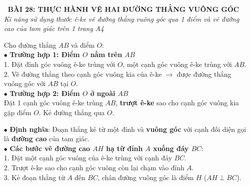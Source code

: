 \documentclass[14pt,a4paper,oneside]{extbook}
\begin{document}
\noindent
\begin{tcolorbox}[
  enhanced,
  colback=teal!8!white,
  colframe=teal!80!black,
  arc=3mm, boxrule=1pt,
  left=3mm, right=3mm, top=2mm, bottom=2mm,
  halign=center
]
  {\Large\bfseries\color{teal!90!black}\faBookmark\ BÀI 28: THỰC HÀNH VẼ HAI ĐƯỜNG THẲNG VUÔNG GÓC}\\[1.5pt]
  {\footnotesize\itshape\color{black!75} Kĩ năng sử dụng thước ê-ke vẽ đường thẳng vuông góc qua 1 điểm và vẽ đường cao của tam giác trên 1 trang A4}
\end{tcolorbox}

\vspace{2mm}

\noindent
\begin{minipage}[t]{0.49\textwidth}
  \begin{tcolorbox}[
    enhanced,
    title={\footnotesize\bfseries\color{white}\faPencil\ 1. Vẽ đường thẳng vuông góc qua 1 điểm},
    colback=blue!2!white,
    colframe=blue!75!black,
    arc=2.5mm, boxrule=0.8pt, top=1.8mm, bottom=1.8mm, left=2mm, right=2mm
  ]
    \footnotesize
    Cho đường thẳng $AB$ và điểm $O$:\\
    $\bullet$ \textbf{Trường hợp 1: Điểm $O$ nằm trên $AB$}\\
    1. Đặt đỉnh góc vuông ê-ke trùng với $O$, một cạnh góc vuông ê-ke trùng với $AB$.\\
    2. Vẽ đường thẳng theo cạnh góc vuông kia của ê-ke $\rightarrow$ được đường thẳng vuông góc với $AB$ tại $O$.\\[1mm]
    $\bullet$ \textbf{Trường hợp 2: Điểm $O$ ở ngoài $AB$}\\
    Đặt 1 cạnh góc vuông ê-ke trùng $AB$, \textbf{trượt ê-ke} sao cho cạnh góc vuông kia gặp điểm $O$. Kẻ đường thẳng qua $O$.
  \end{tcolorbox}
\end{minipage}%
\hfill
\begin{minipage}[t]{0.49\textwidth}
  \begin{tcolorbox}[
    enhanced,
    title={\footnotesize\bfseries\color{white}\faCrop\ 2. Ứng dụng: Vẽ đường cao tam giác},
    colback=teal!2!white,
    colframe=teal!75!black,
    arc=2.5mm, boxrule=0.8pt, top=1.8mm, bottom=1.8mm, left=2mm, right=2mm
  ]
    \footnotesize
    $\bullet$ \textbf{Định nghĩa}: Đoạn thẳng kẻ từ một đỉnh và \textbf{vuông góc} với cạnh đối diện gọi là \textbf{đường cao} của tam giác.\\
    $\bullet$ \textbf{Các bước vẽ đường cao $AH$ hạ từ đỉnh $A$ xuống đáy $BC$}:\\
    1. Đặt một cạnh góc vuông của ê-ke trùng với cạnh đáy $BC$.\\
    2. Trượt ê-ke sao cho cạnh góc vuông còn lại chạm vào đỉnh $A$.\\
    3. Kẻ đoạn thẳng từ $A$ đến $BC$, chân đường vuông góc là điểm $H$ ($AH \perp BC$).
  \end{tcolorbox}
\end{minipage}
\end{document}
